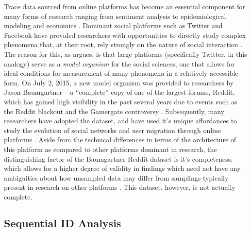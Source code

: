 \documentclass[letterpaper,12pt]{article}
\begin{document}
Trace data sourced from online platforms has become an essential component for many forms of research ranging from sentiment analysis \cite{pak2010twitter} to epidemiological modeling \cite{abdullah2011epidemic} and economics \cite{bollen2011twitter}. Dominant social platforms such as Twitter and Facebook have provided researchers with opportunities to directly study complex phenomena that, at their root, rely strongly on the nature of social interaction \cite{bond201261}. The reason for this, as  argues, is that large platforms (specifically Twitter, in this analogy) serve as a \textit{model organism} for the social sciences, one that allows for ideal conditions for measurement of many phenomena in a relatively accessible form. On July 2, 2015, a new model organism was provided to researchers by Jason Baumgartner -- a ``complete'' copy of one of the largest forums, Reddit, which has gained high visibility in the past several years due to events such as the Reddit blackout \cite{matias2016going,newell2016user,baumgartner2015dataset} and the Gamergate controversy \cite{massanari2015gamergate}. Subsequently, many researchers have adopted the dataset, and have used it's unique affordances to study the evolution of social networks \cite{fire2016time,fire2016analyzing} and user migration through online platforms \cite{tan2015all,newell2016user}. Aside from the technical differences in terms of the architecture of this platform as compared to other platforms dominant in research, the distinguishing factor of the Baumgartner Reddit dataset is it's completeness, which allows for a higher degree of validity in findings which need not have any ambiguities about how unsampled data may differ from samplings typically present in research on other platforms \cite{lotan2011arab}. This dataset, however, is not actually complete.

\subsection{Sequential ID Analysis}
\end{document}
